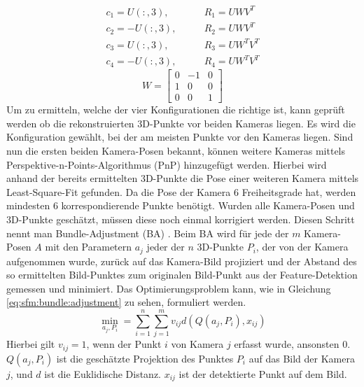\documentclass[12pt,titlepage, twoside]{article}
\begin{document}
\begin{equation}
    \label{eq:sfm:camera:pose}
    \begin{split}
    c_1=U(:,3),&\qquad R_1=UWV^T \\
    c_2=-U(:,3),&\qquad R_2=UWV^T \\
    c_3=U(:,3),&\qquad R_3=UW^TV^T \\
    c_4=-U(:,3),&\qquad R_4=UW^TV^T
    \end{split}
\end{equation}
\begin{equation}
    \label{eq:sfm:camera:pose:w}
W=\begin{bmatrix}
    0 & -1 & 0\\
    1 & 0 & 0\\
    0 & 0 & 1
\end{bmatrix}
\end{equation}
Um zu ermitteln, welche der vier Konfigurationen die richtige ist, kann geprüft werden ob die rekonstruierten 3D-Punkte vor beiden Kameras liegen. 
Es wird die Konfiguration gewählt, bei der am meisten Punkte vor den Kameras liegen. 
Sind nun die ersten beiden Kamera-Posen bekannt, können weitere Kameras mittels Perspektive-n-Points-Algorithmus (PnP) \cite{pnp} hinzugefügt werden. 
Hierbei wird anhand der bereits ermittelten 3D-Punkte die Pose einer weiteren Kamera mittels Least-Square-Fit gefunden. Da die Pose der Kamera 6 Freiheitsgrade hat, werden mindesten 6 korrespondierende Punkte benötigt. 
Wurden alle Kamera-Posen und 3D-Punkte geschätzt, müssen diese noch einmal korrigiert werden. Diesen Schritt nennt man Bundle-Adjustment (BA) \cite{triggs1999bundle}.
Beim BA wird für jede der $m$ Kamera-Posen $A$ mit den Parametern $a_j$ jeder der $n$ 3D-Punkte $P_i$, der von der Kamera aufgenommen wurde, zurück auf das Kamera-Bild projiziert und 
der Abstand des so ermittelten Bild-Punktes zum originalen Bild-Punkt aus der Feature-Detektion gemessen und minimiert. 
Das Optimierungsproblem kann, wie in Gleichung \ref{eq:sfm:bundle:adjustment} zu sehen, formuliert werden. 
\begin{equation}
    \label{eq:sfm:bundle:adjustment}
    \min_{a_j, P_i} = \sum_{i=1}^n \sum_{j=1}^m v_{ij} d(Q(a_j, P_i), x_{ij})
\end{equation}
Hierbei gilt $v_{ij} = 1$, wenn der Punkt $i$ von Kamera $j$ erfasst wurde, ansonsten $0$.
$Q(a_j, P_i)$ ist die geschätzte Projektion des Punktes $P_i$ auf das Bild der Kamera $j$, und $d$ ist die Euklidische Distanz. $x_{ij}$ ist der detektierte Punkt auf dem Bild.
\end{document}
